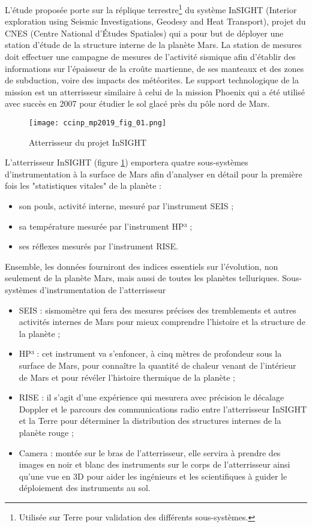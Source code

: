 
L'étude proposée porte sur la réplique terrestre\footnote{Utilisée sur Terre pour validation des différents sous-systèmes.} du système InSIGHT (Interior exploration using
Seismic Investigations, Geodesy and Heat Transport), projet du CNES (Centre National d’Études
Spatiales) qui a pour but de déployer une station d'étude de la structure interne de la planète Mars.
La station de mesures doit effectuer une campagne de mesures de l'activité sismique afin d'établir des
informations sur l'épaisseur de la croûte martienne, de ses manteaux et des zones de subduction, voire
des impacts des météorites.
Le support technologique de la mission est un atterrisseur similaire à celui de la mission Phoenix qui
a été utilisé avec succès en 2007 pour étudier le sol glacé près du pôle nord de Mars.

\begin{figure}[!h]
\centering
\texttt{[image: ccinp\_mp2019\_fig\_01.png]}
\caption{Atterrisseur du projet InSIGHT \label{ccinp_mp2019_fig_01}}
\end{figure}



L'atterrisseur InSIGHT (figure \ref{ccinp_mp2019_fig_01}) emportera quatre sous-systèmes d’instrumentation à la surface de
Mars afin d’analyser en détail pour la première fois les "statistiques vitales" de la planète :
\begin{itemize}
\item son pouls, activité interne, mesuré par l'instrument SEIS ;
\item sa température mesurée par l'instrument HP³ ;
\item ses réflexes mesurés par l'instrument RISE.
\end{itemize}
Ensemble, les données fourniront des indices essentiels sur l'évolution, non seulement de la planète
Mars, mais aussi de toutes les planètes telluriques.
Sous-systèmes d’instrumentation de l’atterrisseur
\begin{itemize}
\item SEIS : sismomètre qui fera des mesures précises des tremblements et autres activités internes
de Mars pour mieux comprendre l'histoire et la structure de la planète ;
\item HP³ : cet instrument va s’enfoncer, à cinq mètres de profondeur sous la surface de Mars, pour
connaître la quantité de chaleur venant de l'intérieur de Mars et pour révéler l'histoire
thermique de la planète ;
\item RISE : il s’agit d’une expérience qui mesurera avec précision le décalage Doppler et le
parcours des communications radio entre l'atterrisseur InSIGHT et la Terre pour déterminer
la distribution des structures internes de la planète rouge ;
\item Camera : montée sur le bras de l'atterrisseur, elle servira à prendre des images en noir et blanc
des instruments sur le corps de l'atterrisseur ainsi qu'une vue en 3D pour aider les ingénieurs
et les scientifiques à guider le déploiement des instruments au sol. 
\end{itemize}


